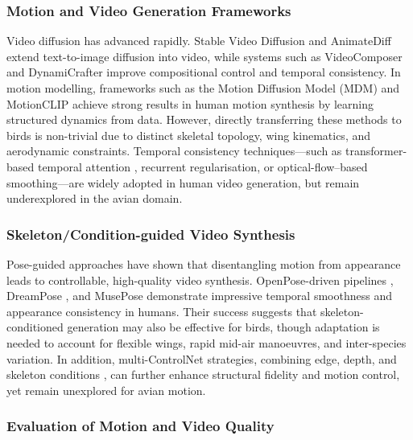 \documentclass[final-report]{report-template}
\begin{document}
\subsubsection*{Motion and Video Generation Frameworks}
Video diffusion has advanced rapidly. Stable Video Diffusion \cite{Blattmann2023SVD} and AnimateDiff \cite{Guo2023AnimateDiff} extend text-to-image diffusion into video, while systems such as VideoComposer \cite{Wang2023VideoComposer} and DynamiCrafter \cite{Xing2024DynamiCrafter} improve compositional control and temporal consistency. In motion modelling, frameworks such as the Motion Diffusion Model (MDM) \cite{Tevet2022MDM} and MotionCLIP \cite{Tevet2022MotionCLIP} achieve strong results in human motion synthesis by learning structured dynamics from data. However, directly transferring these methods to birds is non-trivial due to distinct skeletal topology, wing kinematics, and aerodynamic constraints. Temporal consistency techniques—such as transformer-based temporal attention \cite{Yan2023TECO}, recurrent regularisation, or optical-flow–based smoothing—are widely adopted in human video generation, but remain underexplored in the avian domain.

\subsubsection*{Skeleton/Condition-guided Video Synthesis}
Pose-guided approaches have shown that disentangling motion from appearance leads to controllable, high-quality video synthesis. OpenPose-driven pipelines \cite{Cao2017PAF}, DreamPose \cite{Karras2023DreamPose}, and MusePose \cite{MusePose2024} demonstrate impressive temporal smoothness and appearance consistency in humans. Their success suggests that skeleton-conditioned generation may also be effective for birds, though adaptation is needed to account for flexible wings, rapid mid-air manoeuvres, and inter-species variation. In addition, multi-ControlNet strategies, combining edge, depth, and skeleton conditions \cite{Zhang2023ControlNet}, can further enhance structural fidelity and motion control, yet remain unexplored for avian motion.

\subsubsection*{Evaluation of Motion and Video Quality}
\end{document}
